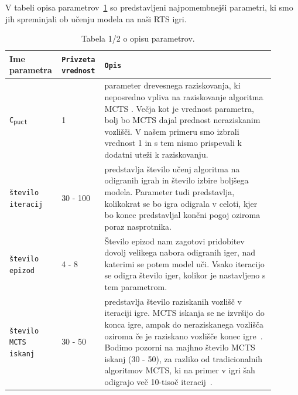 \documentclass[a4paper, 12pt]{book}
\begin{document}
V tabeli opisa parametrov~\ref{tableParameters1} so predstavljeni najpomembnejši parametri, ki smo jih spreminjali ob učenju modela na naši RTS igri.
\begin{table}
	\begin{center}
		\begin{tabular}{p{0.15\linewidth}|p{0.13\linewidth}|p{0.62\linewidth}}
			Ime parametra                             & {\tt Privzeta vrednost} & {\tt Opis} \\ \hline
			{\tt C\textsubscript{puct}}               & 1 						& parameter drevesnega raziskovanja, ki neposredno vpliva na raziskovanje algoritma MCTS . 
																				  Večja kot je vrednost parametra, bolj bo MCTS dajal prednost neraziskanim vozlišči. 
																				  V našem primeru smo izbrali vrednost 1 in s tem nismo prispevali k dodatni uteži k raziskovanju.\\
			{\tt število iteracij}                    & 30 - 100					& predstavlja število učenj algoritma na odigranih igrah in število izbire boljšega modela.
																				  Parameter tudi predstavlja, kolikokrat se bo igra odigrala v celoti, kjer bo konec predstavljal končni pogoj oziroma poraz nasprotnika.\\
			{\tt število epizod}                      & 4 - 8 						& Število epizod nam zagotovi pridobitev dovolj velikega nabora odigranih iger, nad katerimi se potem model uči.
																				  Vsako iteracijo se odigra število iger, kolikor je nastavljeno s tem parametrom.\\
			{\tt število MCTS iskanj}                 & 30 - 50					& predstavlja število raziskanih vozlišč v iteraciji igre. 
														 						  MCTS iskanja se ne izvršijo do konca igre, ampak do neraziskanega vozlišča oziroma če je raziskano vozlišče konec igre~\cite{silver2018general}.
														 						  Bodimo pozorni na majhno število MCTS iskanj (30 - 50), za razliko od tradicionalnih algoritmov MCTS, ki na primer v igri šah odigrajo več 10-tisoč iteracij~\cite{kohne}.\\
		
		\end{tabular}
	\end{center}
	\caption{Tabela 1/2 o opisu parametrov.}
	\label{tableParameters1}
\end{table}
\end{document}
